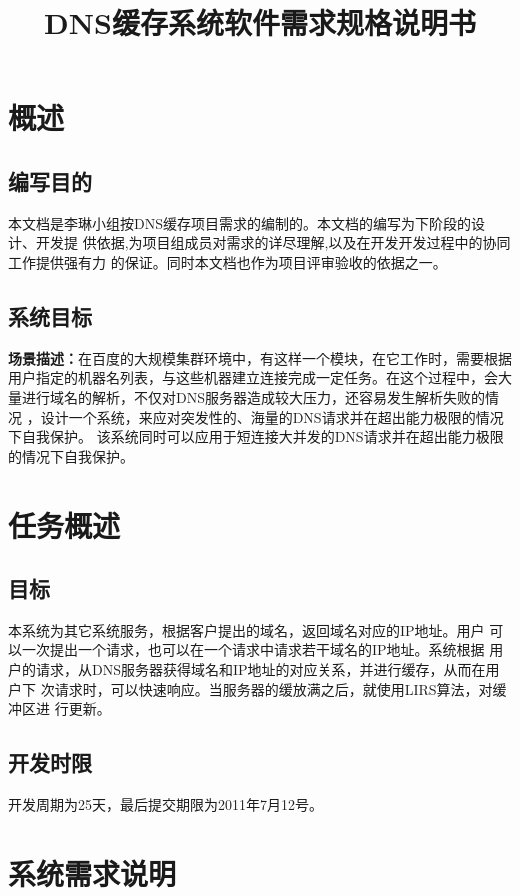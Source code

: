 \documentclass[12pt, a4paper, titlepage]{article}
\title{DNS缓存系统软件需求规格说明书 }
\begin{document}
\maketitle
\tableofcontents
\newpage

\section{ 概述 }

\subsection{编写目的}
	\indent
	本文档是李琳小组按DNS缓存项目需求的编制的。本文档的编写为下阶段的设计、开发提
	供依据,为项目组成员对需求的详尽理解,以及在开发开发过程中的协同工作提供强有力
	的保证。同时本文档也作为项目评审验收的依据之一。

\subsection{系统目标}
	\indent
	\textbf{场景描述：}在百度的大规模集群环境中，有这样一个模块，在它工作时，需要根据
	用户指定的机器名列表，与这些机器建立连接完成一定任务。在这个过程中，会大
	量进行域名的解析，不仅对DNS服务器造成较大压力，还容易发生解析失败的情况
	，设计一个系统，来应对突发性的、海量的DNS请求并在超出能力极限的情况下自我保护。
	该系统同时可以应用于短连接大并发的DNS请求并在超出能力极限的情况下自我保护。


\section{任务概述}
\subsection{目标}
\indent	本系统为其它系统服务，根据客户提出的域名，返回域名对应的IP地址。用户
	可以一次提出一个请求，也可以在一个请求中请求若干域名的IP地址。系统根据
	用户的请求，从DNS服务器获得域名和IP地址的对应关系，并进行缓存，从而在用户下
	次请求时，可以快速响应。当服务器的缓放满之后，就使用LIRS算法，对缓冲区进
	行更新。
	
\subsection{开发时限}
\indent 开发周期为25天，最后提交期限为2011年7月12号。
\section{系统需求说明}
\end{document}
